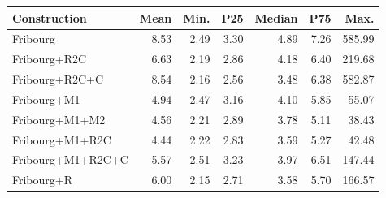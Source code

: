 \begin{table}[ht]
\centering
\begin{tabular}{lrrrrrr}
  \hline
Construction & Mean & Min. & P25 & Median & P75 & Max. \\ 
  \hline
Fribourg & 8.53 & 2.49 & 3.30 & 4.89 & 7.26 & 585.99 \\ 
  Fribourg+R2C & 6.63 & 2.19 & 2.86 & 4.18 & 6.40 & 219.68 \\ 
  Fribourg+R2C+C & 8.54 & 2.16 & 2.56 & 3.48 & 6.38 & 582.87 \\ 
  Fribourg+M1 & 4.94 & 2.47 & 3.16 & 4.10 & 5.85 & 55.07 \\ 
  Fribourg+M1+M2 & 4.56 & 2.21 & 2.89 & 3.78 & 5.11 & 38.43 \\ 
  Fribourg+M1+R2C & 4.44 & 2.22 & 2.83 & 3.59 & 5.27 & 42.48 \\ 
  Fribourg+M1+R2C+C & 5.57 & 2.51 & 3.23 & 3.97 & 6.51 & 147.44 \\ 
  Fribourg+R & 6.00 & 2.15 & 2.71 & 3.58 & 5.70 & 166.57 \\ 
   \hline
\end{tabular}
\end{table}
